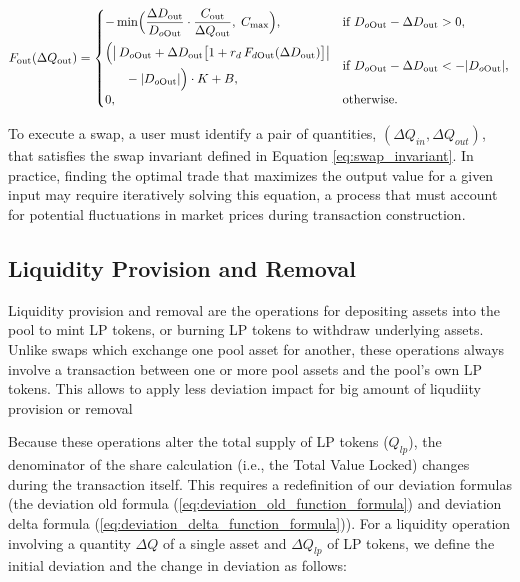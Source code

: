 \begin{equation}
	\label{eq:fee_out_formula}
	F_{\mathrm{out}}(\Delta Q_{\mathrm{out}})
	=
	\begin{cases}
		-\displaystyle\min\Bigl(
		\frac{\Delta D_{\mathrm{out}}}{D_{o\mathrm{Out}}}
		\cdot \frac{C_{\mathrm{out}}}{\Delta Q_{\mathrm{out}}},
		\;C_{\max}
		\Bigr),
		& \text{if } D_{o\mathrm{Out}} - \Delta D_{\mathrm{out}} > 0,
		\\[2ex]
		\displaystyle
		\begin{aligned}
			\Bigl(&\bigl\lvert\,D_{o\mathrm{Out}}
			+ \Delta D_{\mathrm{out}}
			\bigl[1 + r_{d}\,F_{d\mathrm{Out}}(\Delta D_{\mathrm{out}})\bigr]
			\bigr\rvert \\
			&\quad - \lvert D_{o\mathrm{Out}}\rvert\Bigr) \cdot K
			+ B,
		\end{aligned}
		& \text{if } D_{o\mathrm{Out}}
		-\Delta D_{\mathrm{out}}
		< -\lvert D_{o\mathrm{Out}}\rvert,
		\\[2ex]
		0,
		& \text{otherwise.}
	\end{cases}
\end{equation}

To execute a swap, a user must identify a pair of quantities, $(\Delta Q_{in}, \Delta Q_{out})$, that satisfies the swap invariant defined in Equation \ref{eq:swap_invariant}. In practice, finding the optimal trade that maximizes the output value for a given input may require iteratively solving this equation, a process that must account for potential fluctuations in market prices during transaction construction.

\subsection{Liquidity Provision and Removal}

Liquidity provision and removal are the operations for depositing assets into the pool to mint LP tokens, or burning LP tokens to withdraw underlying assets. Unlike swaps which exchange one pool asset for another, these operations always involve a transaction between one or more pool assets and the pool's own LP tokens. This allows to apply less deviation impact for big amount of liqudiity provision or removal

Because these operations alter the total supply of LP tokens ($Q_{lp}$), the denominator of the share calculation (i.e., the Total Value Locked) changes during the transaction itself. This requires a redefinition of our deviation formulas (the deviation old formula (\ref{eq:deviation_old_function_formula}) and deviation delta formula (\ref{eq:deviation_delta_function_formula})). For a liquidity operation involving a quantity $\Delta Q$ of a single asset and $\Delta Q_{lp}$ of LP tokens, we define the initial deviation and the change in deviation as follows:

